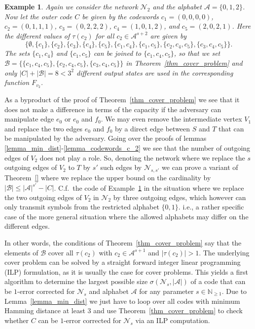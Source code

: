 \documentclass[11pt]{article}
\newcommand{\N}{\mathbb{N}}
\newcommand{\cA}{\mathcal{A}}
\newcommand{\cN}{\mathcal{N}}
\newtheorem{example}[theorem]{Example}
\begin{document}
\begin{example}
  \label{ex_3}
  Again we consider the network $\cN_2$ and the alphabet $\cA=\{0,1,2\}$. Now let the outer code $C$ be given by the codewords  
  $c_1=(0,0,0,0)$, $c_2=(0,1,1,1)$, $c_3=(0,2,2,2)$, $c_4=(1,0,1,2)$, and $c_5=(2,0,2,1)$. Here the different values of $\tau(c_2)$ for all $c_2\in\cA^{s+2}$ are given by  
  $$
    \Big\{
    \emptyset,     
    \{c_1\}, \{c_2\}, \{c_3\}, \{c_4\}, \{c_5\}, \{c_1,c_4\}, \{c_1,c_5\}, \{c_2,c_4,c_5\}, \{c_3,c_4,c_5\}
    \Big\}.
  $$
  The sets $\{c_1,c_4\}$ and $\{c_1,c_5\}$ can be joined to $\{c_1,c_4,c_5\}$, so that we set $\mathcal{B}=\big\{ \{c_1,c_4,c_5\}, \{c_2,c_4,c_5\}, \{c_3,c_4,c_5\}\big\}$ in 
  Theorem~\ref{thm_cover_problem} and only $|C|+|\mathcal{B}|=8<3^2$ different output states are used in the corresponding function $F_{v_2}$.
\end{example}

As a byproduct of the proof of Theorem~\ref{thm_cover_problem} we see that it does not make a difference in terms of the capacity if the adversary can manipulate edge $e_0$ or 
$e_0$ and $f_0$. We may even remove the intermediate vertex $V_1$ and replace the two edges $e_0$ and $f_0$ by a direct edge between $S$ and $T$ that can be manipulated by the 
adversary. Going over the proofs of lemmas \ref{lemma_min_dist}-\ref{lemma_codewords_c_2} we see that the number of outgoing edges of $V_2$ does not play a role. So, 
denoting the network where we replace the $s$ outgoing edges of $V_2$ to $T$ by $s'$ such edges by $\cN_{s,s'}$ we can prove a variant of Theorem~\ref{} 
where we replace the upper bound on the cardinality by $|\mathcal{B}|\le \left|\cA\right|^{s'}-|C|$. C.f.\ the code of Example~\ref{ex_3} in the situation where we replace the 
two outgoing edges of $V_2$ in $\cN_2$ by three outgoing edges, which however can only transmit symbols from the restricted alphabet $\{0,1\}$. i.e., a rather specific case 
of the more general situation where the allowed alphabets may differ on the different edges. 

In other words, the conditions of Theorem~\ref{thm_cover_problem} say that the elements of $\mathcal{B}$ cover all $\tau(c_2)$ with $c_2\in\cA^{s+1}$ and $|\tau(c_2)|>1$. The underlying 
cover problem can be solved by a straight forward integer linear programming (ILP) formulation, as it is usually the case for cover problems. This yields a first algorithm to determine the largest 
possible size $\sigma(\cN_s,|\cA|)$ of a code that can be $1$-error corrected for $\cN_s$ and alphabet $\cA$ for any parameter $s\in\N_{\ge 1}$. Due to Lemma~\ref{lemma_min_dist} we just have to 
loop over all codes with minimum Hamming distance at least $3$ and use Theorem~\ref{thm_cover_problem} to check whether $C$ can be $1$-error corrected for $\cN_s$ via an ILP computation.
\end{document}
